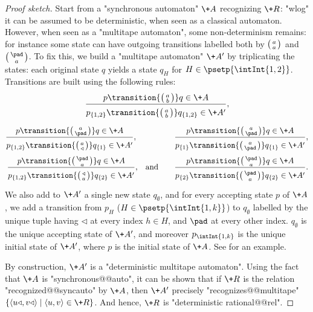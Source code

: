 \begin{proof}[Proof sketch]
	Start from a "synchronous automaton" $\+A$ recognizing $\+R$:
	"wlog" it can be assumed to be deterministic, when seen 
	as a classical automaton. However, when seen as a "multitape automaton", some non-determinism 
	remains: for instance some state can have outgoing transitions labelled both
	by $\pair{a}{a}$ and $\pair{\pad}{a}$.
	To fix this, we build a "multitape automaton" $\+A'$ by triplicating the states:
	each original state $q$ yields a state $q_H$ for $H \in \psetp{\intInt{1,2}}$.
	Transitions are built using the following rules:
	\[
		\frac{
			p \transition{\pair{a}{b}} q \in \+A
		}{
			p_{\{1,2\}} \transition{\pair{a}{b}} q_{\{1,2\}} \in \+A'
			\vphantom{\Big()}
		},
	\]
	\begin{align*}
		\vspace{-2cm}
		\frac{
			p \transition{\pair{a}{\pad}} q \in \+A
		}{
			p_{\{1,2\}} \transition{\pair{a}{\triangleleft}} q_{\{1\}} \in \+A'
			\vphantom{\Big()}
		},\hphantom{\quad and}\qquad
		& 
		\frac{
			p \transition{\pair{a}{\pad}} q \in \+A	
		}{
			p_{\{1\}} \transition{\pair{a}{\pad}} q_{\{1\}} \in \+A'
			\vphantom{\Big()}
		}, \\
		\frac{
			p \transition{\pair{\pad}{a}} q \in \+A
		}{
			p_{\{1,2\}} \transition{\pair{\triangleleft}{a}} q_{\{2\}} \in \+A'
			\vphantom{\Big()}
		}\text{,\quad and}\qquad
		& 
		\frac{
			p \transition{\pair{\pad}{a}} q \in \+A
		}{
			p_{\{2\}} \transition{\pair{\pad}{a}} q_{\{2\}} \in \+A'
			\vphantom{\Big()}
		}.\\
	\end{align*}
	We also add to $\+A'$ a single new state $q_{\emptyset}$, and for every accepting state $p$ of
	$\+A$, we add a transition from $p_H$ ($H \in \psetp{\intInt{1,k}}$) to $q_{\emptyset}$
	labelled by the unique tuple having $\triangleleft$ at every index $h \in H$,
	and $\pad$ at every other index.
	$q_{\emptyset}$ is the unique accepting state of $\+A'$, and moreover
	$p_{\intInt{1,k}}$ is the unique initial state of $\+A'$, where $p$ is the initial state of $\+A$. See  for an example.
	
	By construction, $\+A'$ is a "deterministic multitape automaton". 
	Using the fact that $\+A$ is "synchronous@@auto", it can be shown that
	if $\+R$ is the relation "recognized@@syncauto" by $\+A$, then $\+A'$ precisely 
	"recognizes@@multitape" $\{\tup{u\triangleleft,v\triangleleft} \mid \tup{u,v} \in \+R\}$.
	And hence, $\+R$ is "deterministic rational@@rel".
\end{proof}

